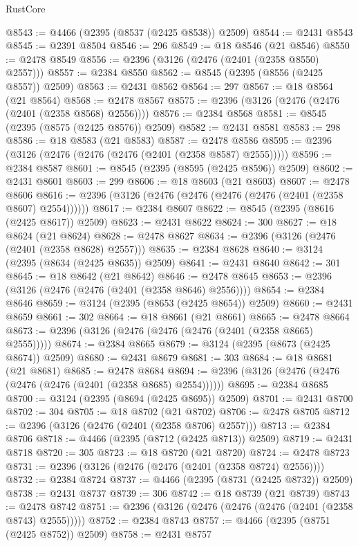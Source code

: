 \begin{lexlean}{RustCore}
\begin{coremodule}
@8543 := @4466 (@2395 (@8537 (@2425 @8538)) @2509)
@8544 := @2431 @8543
@8545 := @2391 @8504
@8546 := 296
@8549 := @18 @8546 (@21 @8546)
@8550 := @2478 @8549
@8556 := @2396 (@3126 (@2476 (@2401 (@2358 @8550) @2557)))
@8557 := @2384 @8550
@8562 := @8545 (@2395 (@8556 (@2425 @8557)) @2509)
@8563 := @2431 @8562
@8564 := 297
@8567 := @18 @8564 (@21 @8564)
@8568 := @2478 @8567
@8575 := @2396 (@3126 (@2476 (@2476 (@2401 (@2358 @8568) @2556))))
@8576 := @2384 @8568
@8581 := @8545 (@2395 (@8575 (@2425 @8576)) @2509)
@8582 := @2431 @8581
@8583 := 298
@8586 := @18 @8583 (@21 @8583)
@8587 := @2478 @8586
@8595 := @2396 (@3126 (@2476 (@2476 (@2476 (@2401 (@2358 @8587) @2555)))))
@8596 := @2384 @8587
@8601 := @8545 (@2395 (@8595 (@2425 @8596)) @2509)
@8602 := @2431 @8601
@8603 := 299
@8606 := @18 @8603 (@21 @8603)
@8607 := @2478 @8606
@8616 := @2396 (@3126 (@2476 (@2476 (@2476 (@2476 (@2401 (@2358 @8607) @2554))))))
@8617 := @2384 @8607
@8622 := @8545 (@2395 (@8616 (@2425 @8617)) @2509)
@8623 := @2431 @8622
@8624 := 300
@8627 := @18 @8624 (@21 @8624)
@8628 := @2478 @8627
@8634 := @2396 (@3126 (@2476 (@2401 (@2358 @8628) @2557)))
@8635 := @2384 @8628
@8640 := @3124 (@2395 (@8634 (@2425 @8635)) @2509)
@8641 := @2431 @8640
@8642 := 301
@8645 := @18 @8642 (@21 @8642)
@8646 := @2478 @8645
@8653 := @2396 (@3126 (@2476 (@2476 (@2401 (@2358 @8646) @2556))))
@8654 := @2384 @8646
@8659 := @3124 (@2395 (@8653 (@2425 @8654)) @2509)
@8660 := @2431 @8659
@8661 := 302
@8664 := @18 @8661 (@21 @8661)
@8665 := @2478 @8664
@8673 := @2396 (@3126 (@2476 (@2476 (@2476 (@2401 (@2358 @8665) @2555)))))
@8674 := @2384 @8665
@8679 := @3124 (@2395 (@8673 (@2425 @8674)) @2509)
@8680 := @2431 @8679
@8681 := 303
@8684 := @18 @8681 (@21 @8681)
@8685 := @2478 @8684
@8694 := @2396 (@3126 (@2476 (@2476 (@2476 (@2476 (@2401 (@2358 @8685) @2554))))))
@8695 := @2384 @8685
@8700 := @3124 (@2395 (@8694 (@2425 @8695)) @2509)
@8701 := @2431 @8700
@8702 := 304
@8705 := @18 @8702 (@21 @8702)
@8706 := @2478 @8705
@8712 := @2396 (@3126 (@2476 (@2401 (@2358 @8706) @2557)))
@8713 := @2384 @8706
@8718 := @4466 (@2395 (@8712 (@2425 @8713)) @2509)
@8719 := @2431 @8718
@8720 := 305
@8723 := @18 @8720 (@21 @8720)
@8724 := @2478 @8723
@8731 := @2396 (@3126 (@2476 (@2476 (@2401 (@2358 @8724) @2556))))
@8732 := @2384 @8724
@8737 := @4466 (@2395 (@8731 (@2425 @8732)) @2509)
@8738 := @2431 @8737
@8739 := 306
@8742 := @18 @8739 (@21 @8739)
@8743 := @2478 @8742
@8751 := @2396 (@3126 (@2476 (@2476 (@2476 (@2401 (@2358 @8743) @2555)))))
@8752 := @2384 @8743
@8757 := @4466 (@2395 (@8751 (@2425 @8752)) @2509)
@8758 := @2431 @8757

\end{coremodule}
\end{lexlean}
